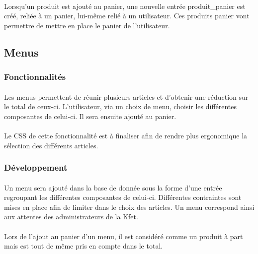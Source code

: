 \documentclass[twoside,UTF8]{EPURapport}
\begin{document}
                \paragraph{}Lorsqu'un produit est ajouté au panier, une nouvelle entrée produit\_panier est créé, reliée à un panier, lui-même relié à un utilisateur. Ces produits panier vont permettre de mettre en place le panier de l'utilisateur.

        \subsection{Menus}

            \subsubsection{Fonctionnalités}

                \paragraph{}Les menus permettent de réunir plusieurs articles et d'obtenir une réduction sur le total de ceux-ci. L'utilisateur, via un choix de menu, choisir les différentes composantes de celui-ci. Il sera ensuite ajouté au panier.

                \paragraph{}Le CSS de cette fonctionnalité est à finaliser afin de rendre plus ergonomique la sélection des différents articles.

            \subsubsection{Développement}
                
                \paragraph{}Un menu sera ajouté dans la base de donnée sous la forme d'une entrée regroupant les différentes composantes de celui-ci. Différentes contraintes sont mises en place afin de limiter dans le choix des articles. Un menu correspond ainsi aux attentes des administrateurs de la Kfet.

                \paragraph{}Lors de l'ajout au panier d'un menu, il est considéré comme un produit à part mais est tout de même pris en compte dans le total.            
\end{document}
